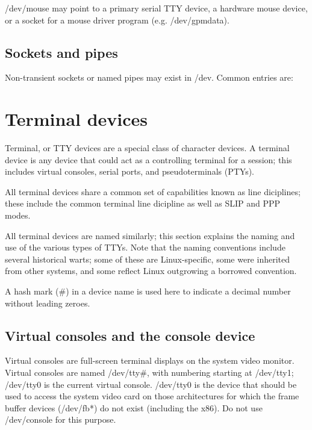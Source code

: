 {\file /dev/mouse} may point to a primary serial TTY device, a
hardware mouse device, or a socket for a mouse driver program
(e.g. {\file /dev/gpmdata}).

\subsection{Sockets and pipes}

Non-transient sockets or named pipes may exist in {\file /dev}.
Common entries are:

\begin{nodelist}
\end{nodelist}

\section{Terminal devices}

Terminal, or TTY devices are a special class of character devices.  A
terminal device is any device that could act as a controlling terminal
for a session; this includes virtual consoles, serial ports, and
pseudoterminals (PTYs).

All terminal devices share a common set of capabilities known as line
diciplines; these include the common terminal line dicipline as well
as SLIP and PPP modes.

All terminal devices are named similarly; this section explains the
naming and use of the various types of TTYs.  Note that the naming
conventions include several historical warts; some of these are
Linux-specific, some were inherited from other systems, and some
reflect Linux outgrowing a borrowed convention.

A hash mark ($\#$) in a device name is used here to indicate a decimal
number without leading zeroes.

\subsection{Virtual consoles and the console device}

Virtual consoles are full-screen terminal displays on the system video
monitor.  Virtual consoles are named {\file /dev/tty$\#$}, with
numbering starting at {\file /dev/tty1}; {\file /dev/tty0} is the
current virtual console.  {\file /dev/tty0} is the device that should
be used to access the system video card on those architectures for
which the frame buffer devices ({\file /dev/fb*}) do not exist
(including the x86).  Do not use {\file /dev/console} for this
purpose.

